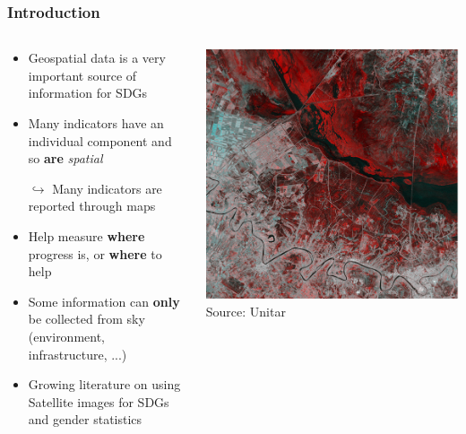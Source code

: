 \documentclass[xcolor=x11names,compress]{beamer}
\renewcommand{\(}{\begin{columns}}
\renewcommand{\)}{\end{columns}}
\newcommand{\<}[1]{\begin{column}{#1}}
\renewcommand{\>}{\end{column}}
\begin{document}
\begin{frame}
    \frametitle{Introduction}
    \begin{columns}[T]
        \begin{column}{0.7\textwidth}
            \begin{itemize}[<+->]
                \item Geospatial data is a very important source of information for SDGs
                \item Many indicators have an individual component and so \textbf{are} \emph{spatial}
                \item[$\hookrightarrow$] Many indicators are reported through maps
                \item Help measure \textbf{where} progress is, or \textbf{where} to help
                \item Some information can \textbf{only} be collected from sky (environment, infrastructure, ...)
                \item Growing literature on using Satellite images for SDGs and gender statistics
            \end{itemize}
        \end{column}
        \begin{column}{0.3\textwidth}
            \includegraphics[width=\textwidth]{SpatialImageRed.PNG}
             \textcolor{gris}{\footnotesize{Source: Unitar}}
        \end{column}
    \end{columns}
\end{frame}
\end{document}
